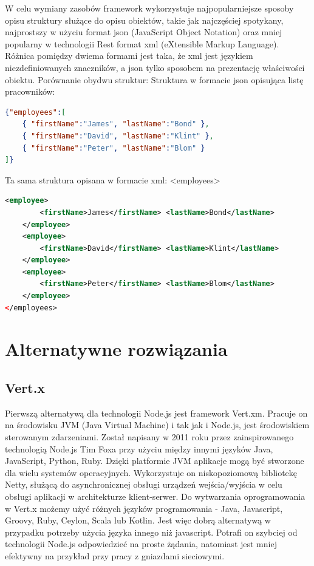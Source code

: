 \documentclass[12pt]{report}
\begin{document}
W celu wymiany zasobów framework wykorzystuje najpopularniejsze sposoby opisu struktury służące do opisu obiektów, takie jak najczęściej spotykany, najprostszy w użyciu format json (JavaScript Object Notation) oraz mniej popularny w technologii Rest format xml (eXtensible Markup Language). 
Różnica pomiędzy dwiema formami jest taka, że xml jest językiem niezdefiniowanych znaczników, a json tylko sposobem na prezentację właściwości obiektu. 
Porównanie obydwu struktur:
Struktura w formacie json opisująca listę pracowników:
\begin{lstlisting}[language=json,firstnumber=1]
{"employees":[
	{ "firstName":"James", "lastName":"Bond" },
	{ "firstName":"David", "lastName":"Klint" },
	{ "firstName":"Peter", "lastName":"Blom" }
]}
\end{lstlisting}
\newpage
Ta sama struktura opisana w formacie xml:
<employees>
\begin{lstlisting}[language=XML,firstnumber=1]
	<employee>
		<firstName>James</firstName> <lastName>Bond</lastName>
	</employee>
	<employee>
		<firstName>David</firstName> <lastName>Klint</lastName>
	</employee>
	<employee>
		<firstName>Peter</firstName> <lastName>Blom</lastName>
	</employee>
</employees>
\end{lstlisting}

\section{Alternatywne rozwiązania}
\subsection{Vert.x}
Pierwszą alternatywą dla technologii Node.js jest framework Vert.xm.
Pracuje on na środowisku JVM (Java Virtual Machine) i tak jak i Node.js, jest środowiskiem sterowanym zdarzeniami.
Został napisany w 2011 roku przez zainspirowanego technologią Node.js Tim Foxa przy użyciu między innymi języków Java, JavaScript, Python, Ruby.
Dzięki platformie JVM aplikacje mogą być stworzone dla wielu systemów operacyjnych.
Wykorzystuje on niskopoziomową bibliotekę Netty, służącą do asynchronicznej obsługi urządzeń wejścia/wyjścia w celu obsługi aplikacji w architekturze klient-serwer.
Do wytwarzania oprogramowania w Vert.x możemy użyć różnych języków programowania - Java, Javascript, Groovy, Ruby, Ceylon, Scala lub Kotlin.
Jest więc dobrą alternatywą w przypadku potrzeby użycia języka innego niż javascript.
Potrafi on szybciej od technologii Node.js odpowiedzieć na proste żądania, natomiast jest mniej efektywny na przykład przy pracy z gniazdami sieciowymi.
\end{document}
